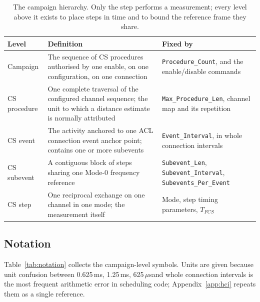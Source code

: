 \documentclass[11pt,a4paper]{article}
\newcommand{\us}{\,\ensuremath{\upmu}s}
\newcommand{\code}[1]{\texttt{\small #1}}
\newcommand{\Tfcs}{T_{FCS}}
\providecommand{\upmu}{\mu}
\begin{document}
\begin{table}[h]
\caption{The campaign hierarchy. Only the step performs a measurement; every level above it exists to
place steps in time and to bound the reference frame they share.}
\label{tab:hierarchy}
\centering\small
\begin{tabular}{@{}L{22mm}L{62mm}L{48mm}@{}}
\toprule
Level & Definition & Fixed by \\
\midrule
Campaign
  & The sequence of CS procedures authorised by one enable, on one configuration, on one connection
  & \code{Procedure\_Count}, and the enable/disable commands \\
CS procedure
  & One complete traversal of the configured channel sequence; the unit to which a distance estimate
    is normally attributed
  & \code{Max\_Procedure\_Len}, channel map and its repetition \\
CS event
  & The activity anchored to one ACL connection event anchor point; contains one or more subevents
  & \code{Event\_Interval}, in whole connection intervals \\
CS subevent
  & A contiguous block of steps sharing one Mode-0 frequency reference
  & \code{Subevent\_Len}, \code{Subevent\_Interval}, \code{Subevents\_Per\_Event} \\
CS step
  & One reciprocal exchange on one channel in one mode; the measurement itself
  & Mode, step timing parameters, $\Tfcs$ \\
\bottomrule
\end{tabular}
\end{table}

\subsection{Notation}

Table~\ref{tab:notation} collects the campaign-level symbols. Units are given because unit confusion
between 0.625\,ms, 1.25\,ms, 625\us and whole connection intervals is the most frequent arithmetic
error in scheduling code; Appendix~\ref{app:hci} repeats them as a single reference.
\end{document}
